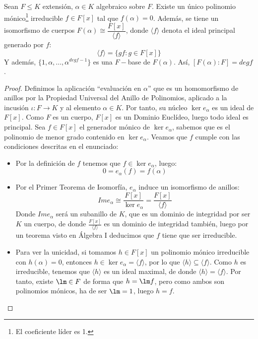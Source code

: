 \begin{prop}\label{prop:pol_irreducible}
    Sean $F\leq K$ extensión, $\alpha\in K$ algebraico sobre $F$. Existe un único polinomio mónico\footnote{El coeficiente líder es 1.} irreducible $f\in F[x]$ tal que $f(\alpha)=0$. Además, se tiene un isomorfismo de cuerpos $F(\alpha)\cong \dfrac{F[x]}{\langle f \rangle }$, donde $\langle f \rangle $ denota el ideal principal generado por $f$:
    \begin{equation*}
        \langle f \rangle  = \{gf : g\in F[x]\}
    \end{equation*}
    Y además, $\{1,\alpha, \ldots, \alpha^{deg f - 1}\}$ es una $F-$base de $F(\alpha)$. Así, $[F(\alpha): F] = degf$.
    \begin{proof} 
        Definimos la aplicación ``evaluación en $\alpha$''
        que es un homomorfismo de anillos por la Propiedad Universal del Anillo de Polinomios, aplicado a la incusión $\iota:F\to K$ y al elemento $\alpha\in K$. Por tanto, su núcleo $\ker e_\alpha$ es un ideal de $F[x]$. Como $F$ es un cuerpo, $F[x]$ es un Dominio Euclídeo, luego todo ideal es principal. Sea $f\in F[x]$ el generador mónico de $\ker e_{\alpha}$, sabemos que es el polinomio de menor grado contenido en $\ker e_{\alpha}$. Veamos que $f$ cumple con las condiciones descritas en el enunciado:
        \begin{itemize}
            \item Por la definición de $f$ tenemos que $f\in \ker e_\alpha$, luego:
                \begin{equation*}
                    0 = e_\alpha(f) = f(\alpha)
                \end{equation*}
            \item Por el Primer Teorema de Isomorfía, $e_{\alpha}$ induce un isomorfismo de anillos:
                \begin{equation*}
                    Im e_\alpha \cong \dfrac{F[x]}{\ker e_\alpha} = \dfrac{F[x]}{\langle f \rangle }
                \end{equation*}
                Donde $Im e_{\alpha}$ será un subanillo de $K$, que es un dominio de integridad por ser $K$ un cuerpo, de donde $\frac{F[x]}{\langle f \rangle }$ es un dominio de integridad también, luego por un teorema visto en Álgebra I deducimos que $f$ tiene que ser irreducible.
            \item Para ver la unicidad, si tomamos $h\in F[x]$ un polinomio mónico irreducible con $h(\alpha)=0$, entonces $h\in \ker e_\alpha = \langle f \rangle $, por lo que $\langle h \rangle \subseteq \langle f \rangle $. Como $h$ es irreducible, tenemos que $\langle h \rangle $ es un ideal maximal, de donde $\langle h \rangle  = \langle f \rangle $. Por tanto, existe $\lm\in F$ de forma que $h=\lm f$, pero como ambos son polinomios mónicos, ha de ser $\lm = 1$, luego $h = f$.

\end{itemize}
\end{proof}
\end{prop}
